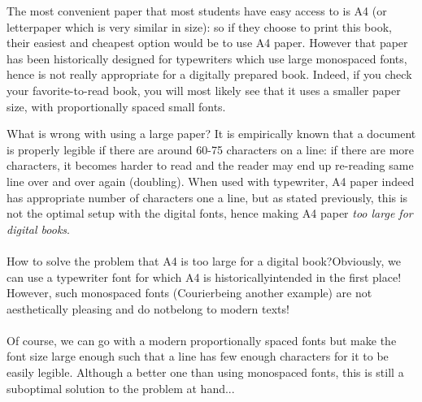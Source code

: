 The most convenient paper that most students have easy access to is A4 (or letterpaper which is very similar in size): so if they choose to print this book, their easiest and cheapest option would be to use A4 paper. However that paper has been historically designed for typewriters which use large monospaced fonts, hence is not really appropriate for a digitally prepared book. Indeed, if you check your favorite-to-read book, you will most likely see that it uses a smaller paper size, with proportionally spaced small fonts.

\begin{fullwidth}
\hphantom{\indent} What is wrong with using a large paper? It is empirically known that a document is properly legible if there are around 60-75 characters on a line: if there are more characters, it becomes harder to read and the reader may end up re-reading same line over and over again (doubling). When used with typewriter, A4 paper indeed has appropriate number of characters one a line, but as stated previously, this is not the optimal setup with the digital fonts, hence making A4 paper \emph{too large for digital books}.
\\\\
{\ttfamily \hphantom{\indent} How to solve the problem that A4 is too large for a digital book?\newline Obviously, we can use a typewriter font for which A4 is historically\newline intended in the first place! However, such monospaced fonts (Courier\newline being another example) are not aesthetically pleasing and do not\newline belong to modern texts!}
\\\\
{\LARGE \hphantom{\indent} Of course, we can go with a modern proportionally spaced fonts but make the font size large enough such that a line has few enough characters for it to be easily legible. Although a better one than using monospaced fonts, this is still a suboptimal solution to the problem at hand...}


\end{fullwidth}
